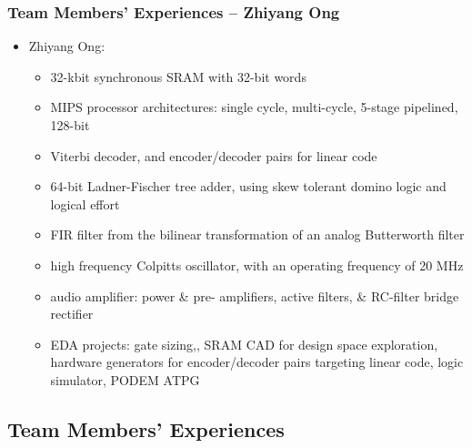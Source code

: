 \documentclass[xcolor={usenames,dvipsnames},hyperref={hyperindex,bookmarks}]{beamer}
\begin{document}
\begin{frame}
	\frametitle{Team Members' Experiences -- Zhiyang Ong}
	
	
	\begin{itemize}
	\item Zhiyang Ong: %
		\begin{itemize} %
		\item 32-kbit synchronous SRAM with 32-bit words
		\item MIPS processor architectures: single cycle, multi-cycle, 5-stage pipelined, 128-bit
		\item Viterbi decoder, and encoder/decoder pairs for linear code
		\item 64-bit Ladner-Fischer tree adder, using skew tolerant domino logic and logical effort
		\item FIR filter from the bilinear transformation of an analog Butterworth filter
		\item high frequency Colpitts oscillator, with an operating frequency of 20 MHz
		\item audio amplifier: power \& pre- amplifiers, active filters, \& RC-filter bridge rectifier
		\item EDA projects: gate sizing,, SRAM CAD for design space exploration, hardware generators for encoder/decoder pairs targeting linear code, logic simulator, PODEM ATPG
		\end{itemize}
	\end{itemize}
	
\end{frame}








\subsection{Team Members' Experiences}
\end{document}
